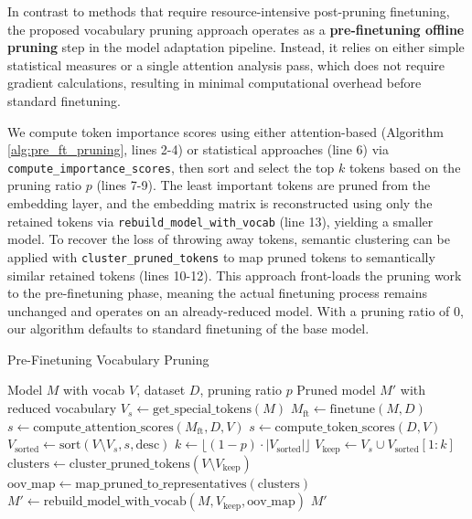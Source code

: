 \documentclass[twocolumn]{article}
\begin{document}
In contrast to methods that require resource-intensive post-pruning finetuning, the proposed vocabulary pruning approach operates as a \textbf{pre-finetuning offline pruning} step in the model adaptation pipeline. 
Instead, it relies on either simple statistical measures or a single attention analysis pass, which does not require gradient calculations, resulting in minimal computational overhead before standard finetuning.


We compute token importance scores using either attention-based (Algorithm \ref{alg:pre_ft_pruning}, lines 2-4) or statistical approaches (line 6) via \texttt{compute\_importance\_scores}, then sort and select the top $k$ tokens based on the pruning ratio $p$ (lines 7-9). 
The least important tokens are pruned from the embedding layer, and the embedding matrix is reconstructed using only the retained tokens via \texttt{rebuild\_model\_with\_vocab} (line 13), yielding a smaller model. 
To recover the loss of throwing away tokens, semantic clustering can be applied with \texttt{cluster\_pruned\_tokens} to map pruned tokens to semantically similar retained tokens (lines 10-12). 
This approach front-loads the pruning work to the pre-finetuning phase, meaning the actual finetuning process remains unchanged and operates on an already-reduced model. With a pruning ratio of 0, our algorithm defaults to standard finetuning of the base model.

\begin{algorithm}[H]
\footnotesize
\caption{Pre-Finetuning Vocabulary Pruning}
\label{alg:pre_ft_pruning}
\begin{algorithmic}[1]
\Require Model $M$ with vocab $V$, dataset $D$, pruning ratio $p$
\Ensure Pruned model $M'$ with reduced vocabulary
\State $V_s \gets \text{get\_special\_tokens}(M)$ \Comment{[CLS], [SEP]}
    \State $M_\text{ft} \gets \text{finetune}(M, D)$ 
    \State $s \gets \text{compute\_attention\_scores}(M_\text{ft}, D, V)$ 
\Else
    \State $s \gets \text{compute\_token\_scores}(D, V)$
\EndIf
\State $V_{\text{sorted}} \gets \text{sort}(V \setminus V_s, s, \text{desc})$
\State $k \gets \lfloor (1-p) \cdot |V_{\text{sorted}}| \rfloor$ 
\State $V_{\text{keep}} \gets V_s \cup V_{\text{sorted}}[1:k]$
    \State $\text{clusters} \gets \text{cluster\_pruned\_tokens}(V \setminus V_{\text{keep}})$
    \State $\text{oov\_map} \gets \text{map\_pruned\_to\_representatives}(\text{clusters})$
\EndIf
\State $M' \gets \text{rebuild\_model\_with\_vocab}(M, V_{\text{keep}}, \text{oov\_map})$
\State \Return $M'$
\end{algorithmic}
\end{algorithm}
\end{document}
